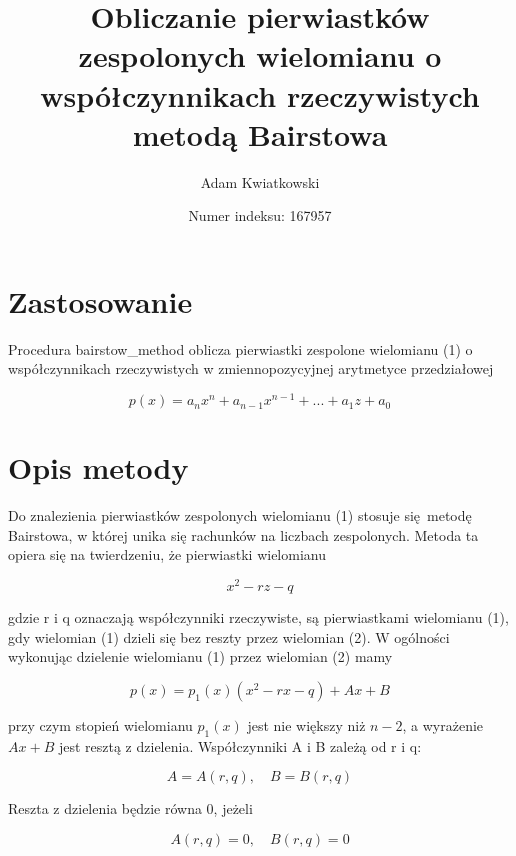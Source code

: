 \documentclass[12pt,a4paper]{article}
\title{Obliczanie pierwiastków zespolonych wielomianu o współczynnikach rzeczywistych
	metodą Bairstowa}
\author{Adam Kwiatkowski}
\date{Numer indeksu: 167957}
\begin{document}
	
	\maketitle
	
	\section{Zastosowanie}
	Procedura bairstow\_method oblicza pierwiastki zespolone wielomianu (1) o współczynnikach rzeczywistych w zmiennopozycyjnej arytmetyce przedziałowej
	
	\begin{equation}
		p(x) = a_nx^n + a_{n-1}x^{n-1} + ... + a_1z + a_0
	\end{equation}
	
	\section{Opis metody}
	Do znalezienia pierwiastków zespolonych wielomianu (1) stosuje się metodę Bairstowa, w której unika się rachunków na liczbach zespolonych. Metoda ta opiera się na twierdzeniu, że pierwiastki wielomianu 
	
	\begin{equation}
		x^2 - rz - q
	\end{equation}

	gdzie r i q oznaczają współczynniki rzeczywiste, są pierwiastkami wielomianu (1), gdy wielomian (1) dzieli się bez reszty przez wielomian (2). W ogólności wykonując dzielenie wielomianu (1) przez wielomian (2) mamy
	
	\begin{equation}
		p(x) = p_1(x)(x^2 - rx - q) + Ax + B
	\end{equation}

	przy czym stopień wielomianu $p_1(x)$ jest nie większy niż $n - 2$, a wyrażenie $Ax + B$ jest resztą z dzielenia. Współczynniki A i B zależą od r i q:
	
	$$A = A(r,q), \quad B = B(r,q) $$
	
	Reszta z dzielenia będzie równa 0, jeżeli 
	
	$$ A(r,q) = 0, \quad B(r,q) = 0$$
	
\end{document}
